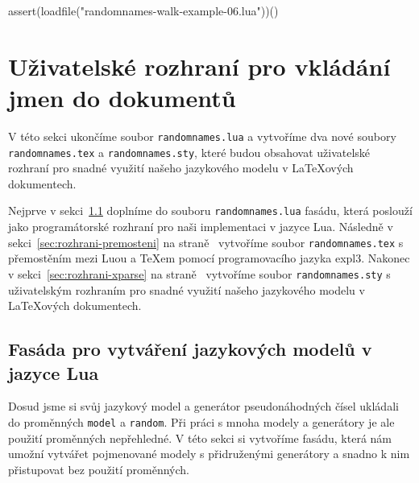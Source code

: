 \documentclass{csbulletin}
\newcommand\vref[1]{\ref{#1} na straně~\pageref{#1}}
\begin{document}
\noindent
\begin{luacode*}
assert(loadfile("randomnames-walk-example-06.lua"))()
\end{luacode*}

\section{Uživatelské rozhraní pro vkládání jmen do dokumentů}
\label{sec:rozhrani}

V této sekci ukončíme soubor \texttt{randomnames.lua} a vytvoříme dva nové soubory \texttt{randomnames.tex} a \texttt{randomnames.sty}, které budou obsahovat uživatelské rozhraní pro snadné využití našeho jazykového modelu v \LaTeX ových dokumentech.

Nejprve v sekci~\ref{sec:rozhrani-fasada} doplníme do souboru \texttt{randomnames.lua} fasádu, která poslouží jako programátorské rozhraní pro naši implementaci v jazyce Lua. Následně v sekci~\vref{sec:rozhrani-premosteni} vytvoříme soubor \texttt{randomnames.tex} s přemostěním mezi Luou a \TeX em pomocí programovacího jazyka expl3. Nakonec v sekci~\vref{sec:rozhrani-xparse} vytvoříme soubor \texttt{randomnames.sty} s uživatelským rozhraním pro snadné využití našeho jazykového modelu v \LaTeX ových dokumentech.

\subsection{Fasáda pro vytváření jazykových modelů v jazyce Lua}
\label{sec:rozhrani-fasada}

Dosud jsme si svůj jazykový model a generátor pseudonáhodných čísel ukládali do proměnných \texttt{model} a \texttt{random}. Při práci s mnoha modely a generátory je ale použití proměnných nepřehledné. V této sekci si vytvoříme fasádu, která nám umožní vytvářet pojmenované modely s přidruženými generátory a snadno k nim přistupovat bez použití proměnných.
\end{document}
